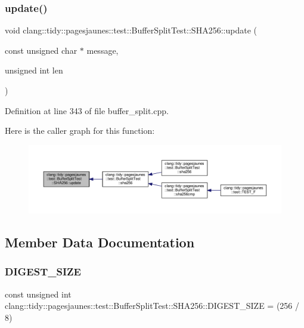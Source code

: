 \subsubsection{\texorpdfstring{update()}{update()}}
{\footnotesize\ttfamily void clang\+::tidy\+::pagesjaunes\+::test\+::\+Buffer\+Split\+Test\+::\+S\+H\+A256\+::update (\begin{DoxyParamCaption}\item[{const unsigned char $\ast$}]{message,  }\item[{unsigned int}]{len }\end{DoxyParamCaption})}



Definition at line 343 of file buffer\+\_\+split.\+cpp.

Here is the caller graph for this function\+:
\nopagebreak
\begin{figure}[H]
\begin{center}
\leavevmode
\includegraphics[width=350pt]{classclang_1_1tidy_1_1pagesjaunes_1_1test_1_1_buffer_split_test_1_1_s_h_a256_a7fbab90c24ec27e25ec43c5f91dc5d70_icgraph}
\end{center}
\end{figure}


\subsection{Member Data Documentation}
\mbox{\label{classclang_1_1tidy_1_1pagesjaunes_1_1test_1_1_buffer_split_test_1_1_s_h_a256_a5bc8c8049db25b1fd722b7a0a6cb2a3a}} 
\subsubsection{\texorpdfstring{D\+I\+G\+E\+S\+T\+\_\+\+S\+I\+ZE}{DIGEST\_SIZE}}
{\footnotesize\ttfamily const unsigned int clang\+::tidy\+::pagesjaunes\+::test\+::\+Buffer\+Split\+Test\+::\+S\+H\+A256\+::\+D\+I\+G\+E\+S\+T\+\_\+\+S\+I\+ZE = (256 / 8)\hspace{0.3cm}{\ttfamily [static]}}



